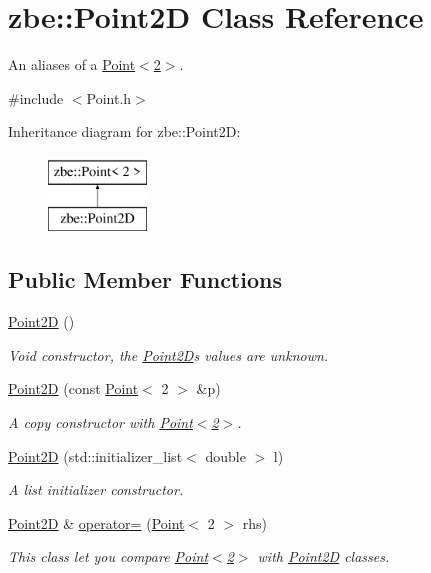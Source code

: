 \hypertarget{classzbe_1_1_point2_d}{}\section{zbe\+:\+:Point2\+D Class Reference}
\label{classzbe_1_1_point2_d}


An aliases of a \hyperlink{classzbe_1_1_point}{Point$<$2$>$}.  




{\ttfamily \#include $<$Point.\+h$>$}

Inheritance diagram for zbe\+:\+:Point2\+D\+:\begin{figure}[H]
\begin{center}
\leavevmode
\includegraphics[height=2.000000cm]{classzbe_1_1_point2_d}
\end{center}
\end{figure}
\subsection*{Public Member Functions}
\begin{DoxyCompactItemize}
\item 
\hyperlink{classzbe_1_1_point2_d_a377ba7e87a56d280fb66c666ccfc873e}{Point2\+D} ()
\begin{DoxyCompactList}\small\item\em Void constructor, the \hyperlink{classzbe_1_1_point2_d}{Point2\+D}\textquotesingle{}s values are unknown. \end{DoxyCompactList}\item 
\hyperlink{classzbe_1_1_point2_d_a6a385429fc369e6d56a73497b4a3ea67}{Point2\+D} (const \hyperlink{classzbe_1_1_point}{Point}$<$ 2 $>$ \&p)
\begin{DoxyCompactList}\small\item\em A copy constructor with \hyperlink{classzbe_1_1_point}{Point$<$2$>$}. \end{DoxyCompactList}\item 
\hyperlink{classzbe_1_1_point2_d_adb2dfc5d538078d361d21a418553b4d0}{Point2\+D} (std\+::initializer\+\_\+list$<$ double $>$ l)
\begin{DoxyCompactList}\small\item\em A list initializer constructor. \end{DoxyCompactList}\item 
\hyperlink{classzbe_1_1_point2_d}{Point2\+D} \& \hyperlink{classzbe_1_1_point2_d_a01ef2d238d9c648676eacc4946bd12b7}{operator=} (\hyperlink{classzbe_1_1_point}{Point}$<$ 2 $>$ rhs)
\begin{DoxyCompactList}\small\item\em This class let you compare \hyperlink{classzbe_1_1_point}{Point$<$2$>$} with \hyperlink{classzbe_1_1_point2_d}{Point2\+D} classes. \end{DoxyCompactList}\end{DoxyCompactItemize}
